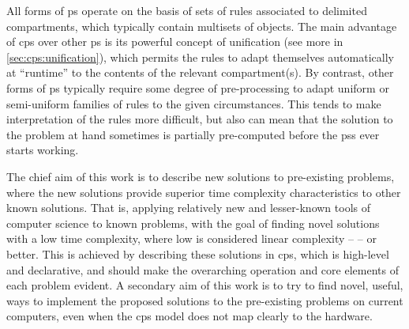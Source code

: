 All forms of \gls{ps} operate on the basis of sets of rules associated to delimited \glspl{compartment}, which typically contain multisets of objects. The main advantage of \gls{cps} over other \gls{ps} is its powerful concept of unification (see more in \vref{sec:cps:unification}), which permits the rules to adapt themselves automatically at ``runtime'' to the contents of the relevant \gls{compartment}(s).  By contrast, other forms of \gls{ps} typically require some degree of pre-processing to adapt uniform or semi-uniform families of rules to the given circumstances.  This tends to make interpretation of the rules more difficult, but also can mean that the solution to the problem at hand sometimes is partially pre-computed before the \glspl{ps} ever starts working.

The chief aim of this work is to describe new solutions to pre-existing problems, where the new solutions provide superior time complexity characteristics to other known solutions.  That is, applying relatively new and lesser-known tools of computer science to known problems, with the goal of finding novel solutions with a low time complexity, where low is considered linear complexity --  -- or better.  
This is achieved by describing these solutions in \gls{cps}, which is high-level and declarative, and should make the overarching operation and core elements of each problem evident.
A secondary aim of this work is to try to find novel, useful, ways to implement the proposed solutions to the pre-existing problems on current computers, even when the \gls{cps} model does not map clearly to the hardware.  



